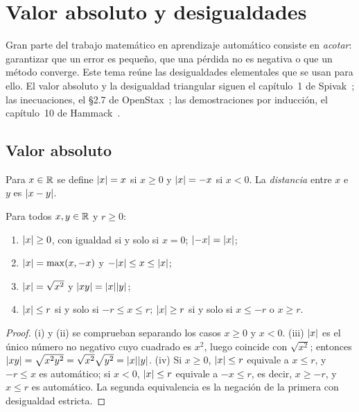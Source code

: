 \chapter{Valor absoluto y desigualdades}
\label{tema:2}

Gran parte del trabajo matemático en aprendizaje automático consiste en \emph{acotar}: garantizar que un error es pequeño, que una pérdida no es negativa o que un método converge. Este tema reúne las desigualdades elementales que se usan para ello. El valor absoluto y la desigualdad triangular siguen el capítulo~1 de Spivak~\cite{spivak}; las inecuaciones, el §2.7 de OpenStax~\cite{openstax}; las demostraciones por inducción, el capítulo~10 de Hammack~\cite{hammack}.

\section{Valor absoluto}

\begin{definicion}\label{def:abs}
Para $x\in\mathbb{R}$ se define $\lvert x\rvert=x$ si $x\ge 0$ y $\lvert x\rvert=-x$ si $x<0$. La \emph{distancia} entre $x$ e $y$ es $\lvert x-y\rvert$.
\end{definicion}

\begin{proposicion}\label{prop:abs}
Para todos $x,y\in\mathbb{R}$ y $r\ge 0$:
\begin{enumerate}
  \item $\lvert x\rvert\ge 0$, con igualdad si y solo si $x=0$; $\lvert-x\rvert=\lvert x\rvert$;
  \item $\lvert x\rvert=\max(x,-x)$ y $-\lvert x\rvert\le x\le\lvert x\rvert$;
  \item $\lvert x\rvert=\sqrt{x^2}$ y $\lvert xy\rvert=\lvert x\rvert\lvert y\rvert$;
  \item $\lvert x\rvert\le r$ si y solo si $-r\le x\le r$; $\lvert x\rvert\ge r$ si y solo si $x\le -r$ o $x\ge r$.
\end{enumerate}
\end{proposicion}

\begin{proof}
(i) y (ii) se comprueban separando los casos $x\ge0$ y $x<0$. (iii) $\lvert x\rvert$ es el único número no negativo cuyo cuadrado es $x^2$, luego coincide con $\sqrt{x^2}$; entonces $\lvert xy\rvert=\sqrt{x^2y^2}=\sqrt{x^2}\sqrt{y^2}=\lvert x\rvert\lvert y\rvert$. (iv) Si $x\ge0$, $\lvert x\rvert\le r$ equivale a $x\le r$, y $-r\le x$ es automático; si $x<0$, $\lvert x\rvert\le r$ equivale a $-x\le r$, es decir, $x\ge -r$, y $x\le r$ es automático. La segunda equivalencia es la negación de la primera con desigualdad estricta.
\end{proof}

